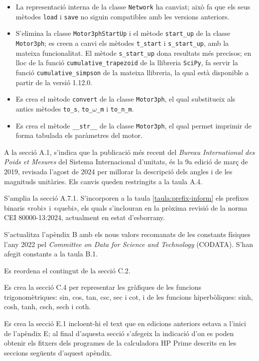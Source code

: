 \begin{itemize}
	\item La representació interna de la classe \texttt{Network} ha canviat; això fa que els seus mètodes \texttt{load} i  \texttt{save} no siguin compatibles amb les versions anteriors. 
	\item S'elimina la classe  \texttt{Motor3phStartUp} i el mètode  \texttt{start\_up} de la classe  \texttt{Motor3ph}; es creen a canvi els mètodes   \texttt{t\_start} i  \texttt{s\_start\_up}, amb la mateixa funcionalitat. 	El mètode \texttt{s\_start\_up} dona  resultats més precisos; en lloc de la  funció \texttt{cumulative\_trapezoid} de la llibreria \texttt{SciPy}, fa servir la funció \texttt{cumulative\_simpson} de la mateixa llibreria, la qual està disponible a partir de la versió 1.12.0. 
	\item Es crea el mètode \texttt{convert} de la classe \texttt{Motor3ph}, el qual substitueix als antics mètodes \texttt{to\_s},  \texttt{to\_$\omega$\_m} i \texttt{to\_n\_m}.
	\item Es crea el mètode  \texttt{\_\_str\_\_} de la classe \texttt{Motor3ph}, el qual permet imprimir de forma tabulada els paràmetres del motor.
\end{itemize}
	
 
A la secció A.1, s'indica que la publicació més recent del \textit{Bureau 	International des Poids et Mesures} del Sistema Internacional d'unitats, és la  9a edició de març de 2019, revisada l'agost de 2024 per millorar la descripció dels angles i de les 
magnituds unitàries. Els canvis queden restringits a la taula A.4.

S'amplia la secció A.7.1. S'incorporen a la taula \ref{taula:prefix-inform} els prefixes binaris «robi» i «quebi», els quals s'inclouran en la pròxima revisió de la norma CEI 80000-13:2024, actualment en estat d'esborrany.

S'actualitza l'apèndix  B amb els nous valors recomanats de les constants físiques  l'any 2022 pel \textit{Committee on Data for Science and Technology} (CODATA). S'han afegit constants a la taula B.1.

Es reordena el contingut de la secció C.2.

Es crea la secció C.4 per  representar les gràfiques de les funcions trigonomètriques: sin, cos, tan, csc, sec i cot, i de les funcions hiperbòliques: sinh, cosh, tanh, csch, sech i coth.

Es crea la secció E.1 incloent-hi el text que en edicions anteriors estava a l'inici de l'apèndix E; al final d'aquesta secció s'afegeix la indicació d'on es poden obtenir els fitxers dels programes de la calculadora \textsf{HP Prime} descrits en les seccions següents d'aquest apèndix.

